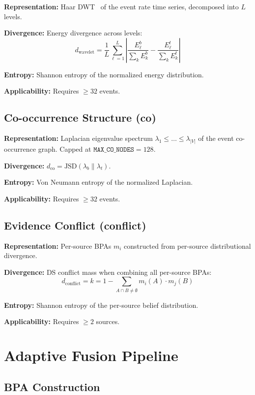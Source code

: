 \documentclass[10pt,twocolumn]{article}
\begin{document}
\textbf{Representation:} Haar DWT~\cite{mallat1989} of the event rate time series, decomposed into $L$ levels.

\textbf{Divergence:} Energy divergence across levels:
\[
d_{\text{wavelet}} = \frac{1}{L} \sum_{\ell=1}^{L} \left| \frac{E_\ell^b}{\sum_k E_k^b} - \frac{E_\ell^t}{\sum_k E_k^t} \right|
\]

\textbf{Entropy:} Shannon entropy of the normalized energy distribution.

\textbf{Applicability:} Requires $\geq 32$ events.

\subsection{Co-occurrence Structure (co)}

\textbf{Representation:} Laplacian eigenvalue spectrum $\lambda_1 \leq \ldots \leq \lambda_{|V|}$ of the event co-occurrence graph. Capped at $\texttt{MAX\_CO\_NODES} = 128$.

\textbf{Divergence:} $d_{\text{co}} = \text{JSD}(\lambda_b \| \lambda_t)$.

\textbf{Entropy:} Von Neumann entropy of the normalized Laplacian.

\textbf{Applicability:} Requires $\geq 32$ events.

\subsection{Evidence Conflict (conflict)}

\textbf{Representation:} Per-source BPAs $m_i$ constructed from per-source distributional divergence.

\textbf{Divergence:} DS conflict mass when combining all per-source BPAs:
\[
d_{\text{conflict}} = k = 1 - \sum_{A \cap B \neq \emptyset} m_i(A) \cdot m_j(B)
\]

\textbf{Entropy:} Shannon entropy of the per-source belief distribution.

\textbf{Applicability:} Requires $\geq 2$ sources.

\section{Adaptive Fusion Pipeline}

\subsection{BPA Construction}
\end{document}

